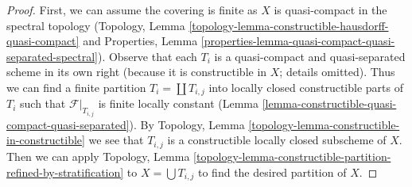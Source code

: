 \documentclass[10pt,a4paper]{amsart}
\theoremstyle{plain}
\theoremstyle{definition}
\theoremstyle{remark}
\numberwithin{equation}{subsection}
\begin{document}
\begin{proof}
First, we can assume the covering is finite as $X$ is quasi-compact
in the spectral topology
(Topology, Lemma \ref{topology-lemma-constructible-hausdorff-quasi-compact}
and
Properties, Lemma
\ref{properties-lemma-quasi-compact-quasi-separated-spectral}).
Observe that each $T_i$ is a quasi-compact and quasi-separated
scheme in its own right (because it is constructible in $X$; details omitted).
Thus we can find a finite partition $T_i = \coprod T_{i, j}$ into
locally closed constructible parts of $T_i$ such that
$\mathcal{F}|_{T_{i, j}}$ is finite locally constant
(Lemma \ref{lemma-constructible-quasi-compact-quasi-separated}).
By Topology, Lemma \ref{topology-lemma-constructible-in-constructible}
we see that $T_{i, j}$ is a constructible locally closed subscheme of $X$.
Then we can apply Topology, Lemma
\ref{topology-lemma-constructible-partition-refined-by-stratification}
to $X = \bigcup T_{i, j}$ to find the desired partition of $X$.
\end{proof}
\end{document}

